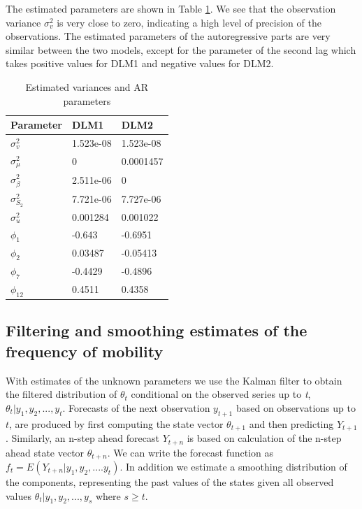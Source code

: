 \documentclass[]{article}
\begin{document}
The estimated parameters are shown in Table
\ref{tab:estimated-parameters}. We see that the observation variance
\(\sigma_{v}^{2}\) is very close to zero, indicating a high level of
precision of the observations. The estimated parameters of the
autoregressive parts are very similar between the two models, except for
the parameter of the second lag which takes positive values for DLM1 and
negative values for DLM2.

\begin{table}[t]

\caption{\label{tab:estimated-parameters}Estimated variances and AR parameters}
\centering
\begin{tabular}{lll}
\toprule
Parameter & DLM1 & DLM2\\
\midrule
$\sigma_{v}^{2}$ & 1.523e-08 & 1.523e-08\\
$\sigma_{\mu}^{2}$ & 0 & 0.0001457\\
$\sigma_{\beta}^{2}$ & 2.511e-06 & 0\\
$\sigma_{S_{2}}^{2}$ & 7.721e-06 & 7.727e-06\\
$\sigma^{2}_{u}$ & 0.001284 & 0.001022\\
\addlinespace
$\phi_{1}$ & -0.643 & -0.6951\\
$\phi_{2}$ & 0.03487 & -0.05413\\
$\phi_{7}$ & -0.4429 & -0.4896\\
$\phi_{12}$ & 0.4511 & 0.4358\\
\bottomrule
\end{tabular}
\end{table}

\subsection{Filtering and smoothing estimates of the frequency of
mobility}\label{filtering-and-smoothing-estimates-of-the-frequency-of-mobility}

With estimates of the unknown parameters we use the Kalman filter to
obtain the filtered distribution of \(\theta_{t}\) conditional on the
observed series up to \emph{t}, \(\theta_{t} | y_{1}, y_{2},...,y_{t}\).
Forecasts of the next observation \(y_{t+1}\) based on observations up
to \(t\), are produced by first computing the state vector
\(\theta_{t+1}\) and then predicting \(Y_{t+1}\). Similarly, an n-step
ahead forecast \(Y_{t+n}\) is based on calculation of the n-step ahead
state vector \(\theta_{t+n}\). We can write the forecast function as
\(f_{t} = E(Y_{t+n} | y_{1}, y_{2}, ....y_{t})\). In addition we
estimate a smoothing distribution of the components, representing the
past values of the states given all observed values
\(\theta_{t} | y_{1}, y_{2},...,y_{s}\) where \(s \ge t\).
\end{document}
